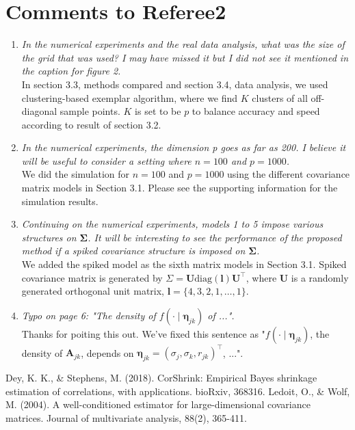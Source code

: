 \documentclass[12pt]{article}
\def\bs{\boldsymbol}
\begin{document}
\section{Comments to Referee2}
\begin{enumerate}
\item \emph{In the numerical experiments and the real data analysis, what was the size of the grid that was used? I may have missed it but I did not see it mentioned in the caption for figure 2.}\\
In section 3.3, methods compared and section 3.4, data analysis, we used clustering-based exemplar algorithm, where we find $K$ clusters of all off-diagonal sample points. $K$ is set to be $p$ to balance accuracy and speed according to result of section 3.2.
\item \emph{In the numerical experiments, the dimension p goes as far as 200. I believe it will be useful to consider a setting where $n = 100$ and $p = 1000$.} \\
We did the simulation for $n=100$ and $p=1000$ using the different covariance matrix models in Section 3.1. Please see the supporting information for the simulation results.  
\item \emph{Continuing on the numerical experiments, models 1 to 5 impose various structures on $\bs{\Sigma}$. It will be interesting to see the performance of the proposed method if a spiked covariance structure is imposed on $\bs{\Sigma}$.} \\
We added the spiked model as the sixth matrix models in Section 3.1. Spiked covariance matrix is generated by $\Sigma = \bs{U}\text{diag}(\bs{l})\bs{U}^\top$, where $\bs{U}$ is a randomly generated orthogonal unit matrix, $\bs{l} = \{4,3,2,1,\ldots,1\}$.
\item \emph{Typo on page 6: "The density of $f(\cdot \mid \bs{\eta}_{jk})$ of ...".}\\
Thanks for poiting this out. We've fixed this sentence as "$f(\cdot \mid \bs{\eta}_{jk})$, the density of $\bs{A}_{jk}$, depends on $\bs{\eta}_{jk} = (\sigma_j, \sigma_k, r_{jk})^\top$, ...".
\end{enumerate}
\begin{thebibliography}{9}
Dey, K. K., \& Stephens, M. (2018). CorShrink: Empirical Bayes shrinkage estimation of correlations, with applications. bioRxiv, 368316.
Ledoit, O., \& Wolf, M. (2004). A well-conditioned estimator for large-dimensional covariance matrices. Journal of multivariate analysis, 88(2), 365-411.

\end{thebibliography}
\end{document}
